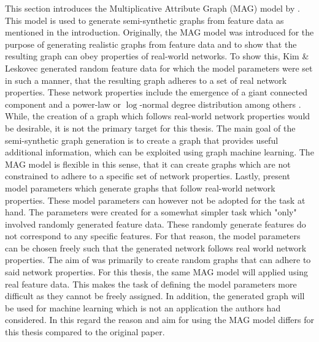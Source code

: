 	This section introduces the Multiplicative Attribute Graph (MAG) model by
	\cite{kim2012multiplicative}. This model is used to generate
	semi-synthetic graphs from feature data as mentioned in the introduction. 
	Originally, the MAG model was introduced for the purpose of generating 
	realistic graphs from feature data and to show that the resulting graph can 
	obey properties of real-world networks. To show this, Kim \& Leskovec 
	generated random feature data for which the model parameters were set in 
	such a manner, that the resulting graph adheres to a set of real network 
	properties. These network properties include the emergence of a giant
	connected component and a power-law or $\log$-normal degree distribution
	among others \citep[p. 113]{kim2012multiplicative}. While, the creation of a 
	graph which follows real-world network properties would be desirable, it is 
	not the primary target for this thesis. The main goal of the semi-synthetic 
	graph generation is to create a graph that provides useful additional 
	information, which can be exploited using graph machine learning. The MAG 
	model is flexible in this sense, that it can create graphs which are not 
	constrained to adhere to a specific set of network properties. Lastly, 
	\citeauthor{kim2012multiplicative} 
	\citeyearpar[p. 138-139]{kim2012multiplicative} present model parameters 
	which generate graphs that follow real-world network properties. These model 
	parameters can however not be adopted for the task at hand. The parameters 
	were created for a somewhat simpler task which "only" involved randomly 
	generated feature data. These randomly generate features do not correspond
	to any specific features. For that reason, the model parameters can be
	chosen freely such that the generated network follows real world network
	properties. The aim of \citeauthor{kim2012multiplicative} was primarily to
	create random graphs that can adhere to said network properties. For this
	thesis, the same MAG model will applied using real feature data. This makes
	the task of defining the model parameters more difficult as they cannot be
	freely assigned. In addition, the generated graph will be used for machine
	learning which is not an application the authors had considered. In this 
	regard the reason and aim for using the MAG model differs for this thesis 
	compared to the original paper. \\

